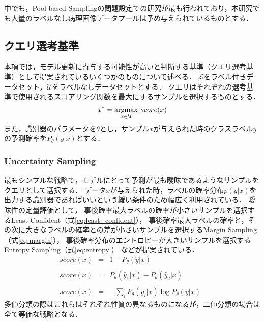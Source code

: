 中でも，Pool-based Samplingの問題設定での研究が最も行われており，本研究でも大量のラベルなし病理画像データプールは予め与えられているものとする．

\subsection{クエリ選考基準}
\label{query_strategy}
本項では，モデル更新に寄与する可能性が高いと判断する基準（クエリ選考基準）として提案されているいくつかのものについて述べる．
$\mathcal{L}$をラベル付きデータセット，$\mathcal{U}$をラベルなしデータセットとする．
クエリはそれぞれの選考基準で使用されるスコアリング関数を最大にするサンプルを選択するものとする．
\begin{eqnarray}
    x^{*} = \argmax_{x \in \mathcal{U}} \: score(x)
\end{eqnarray}
また，識別器のパラメータを$\theta$とし，サンプル$x$が与えられた時のクラスラベル$y$の予測確率を$P_{\theta}(y|x)$とする．

\subsubsection{Uncertainty Sampling \cite{lewis1994sequential}} 
最もシンプルな戦略で，モデルにとって予測が最も曖昧であるようなサンプルをクエリとして選択する．
データ$x$が与えられた時，ラベルの確率分布$p(y|x)$を出力する識別器であればいいという緩い条件のため幅広く利用されている．
曖昧性の定量評価として，
事後確率最大ラベルの確率が小さいサンプルを選択するLeast Confident（式\ref{eq:least_confident}），
事後確率最大ラベルの確率と，その次に大きなラベルの確率との差が小さいサンプルを選択するMargin Sampling（式\ref{eq:margin}），
事後確率分布のエントロピーが大きいサンプルを選択するEntropy Sampling（式\ref{eq:entropy}）
などが提案されている．
\begin{eqnarray}
    score(x) &=& 1 - P_{\theta}(\hat{y}|x)  \;\;  \label{eq:least_confident} \\ \nonumber \\ 
    score(x) &=& P_{\theta}(\hat{y}_1|x) - P_{\theta}(\hat{y}_2|x)  \;\;  \label{eq:margin}\\ \nonumber \\
    score(x) &=& - \sum_i {P_{\theta}(y_i|x)} \log P_{\theta}(y|x)  \;\;  \label{eq:entropy}
\end{eqnarray}
多値分類の際はこれらはそれぞれ性質の異なるものになるが，二値分類の場合は全て等価な戦略となる．


